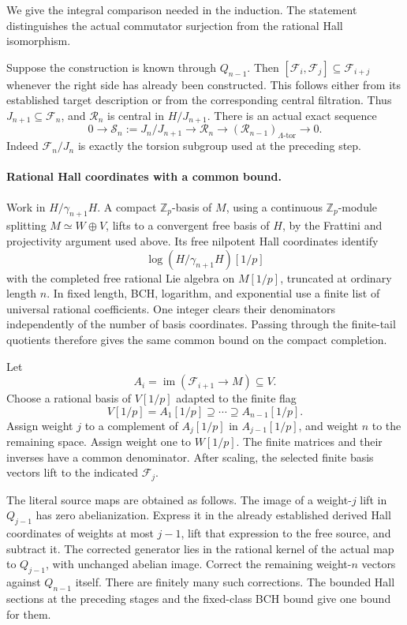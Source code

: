 \documentclass[11pt]{article}
\theoremstyle{definition}\newtheorem{definition}[theorem]{Definition}
\begin{document}
We give the integral comparison needed in the induction.
The statement distinguishes the actual commutator surjection
from the rational Hall isomorphism.

Suppose the construction is known through \(Q_{n-1}\).  Then
\([\mathcal F_i,\mathcal F_j]\subseteq \mathcal F_{i+j}\) whenever the right side has
already been constructed.  This follows either from its
established target description or from the corresponding
central filtration.  Thus \(J_{n+1}\subseteq \mathcal F_n\), and \(\mathcal R_n\)
is central in \(H/J_{n+1}\).  There is an actual exact sequence
\begin{equation}\label{eq:uniform-central-sequence}
 0\longrightarrow \mathcal S_n:=J_n/J_{n+1}
 \longrightarrow \mathcal R_n
 \longrightarrow (\mathcal R_{n-1})_{\Lambda\text{-tor}}
 \longrightarrow0.
\end{equation}
Indeed \(\mathcal F_n/J_n\) is exactly the torsion subgroup used at the
preceding step.

\paragraph{Rational Hall coordinates with a common bound.}
Work in \(H/\gamma_{n+1}H\).  A compact
\(\mathbb Z_p\)-basis of \(M\), using a continuous \(\mathbb Z_p\)-module splitting \(M\simeq W\oplus V\), lifts to a convergent
free basis of \(H\), by the Frattini and projectivity argument
used above.  Its free nilpotent Hall coordinates identify
\[
       \log(H/\gamma_{n+1}H)[1/p]
\]
with the completed free rational Lie algebra on \(M[1/p]\),
truncated at ordinary length \(n\).
In fixed length, BCH, logarithm, and exponential use a finite
list of universal rational coefficients.  One integer clears
their denominators independently of the number of basis
coordinates.  Passing through the finite-tail quotients
therefore gives the same common bound on the compact completion.

Let
\[
 A_i=\operatorname{im}(\mathcal F_{i+1}\longrightarrow M)\subseteq V.
\]
Choose a rational basis of \(V[1/p]\) adapted to the finite flag
\[
 V[1/p]=A_1[1/p]\supseteq\cdots\supseteq A_{n-1}[1/p].
\]
Assign weight \(j\) to a complement of \(A_j[1/p]\) in
\(A_{j-1}[1/p]\), and weight \(n\) to the remaining space.
Assign weight one to \(W[1/p]\).
The finite matrices and their inverses have a common denominator.
After scaling, the selected finite basis vectors lift to the
indicated \(\mathcal F_j\).

The literal source maps are obtained as follows.  The image of
a weight-\(j\) lift in \(Q_{j-1}\) has zero abelianization.
Express it in the already established derived Hall coordinates
of weights at most \(j-1\), lift that expression to the free
source, and subtract it.  The corrected generator lies in the
rational kernel of the actual map to \(Q_{j-1}\), with unchanged
abelian image.  Correct the remaining weight-\(n\) vectors
against \(Q_{n-1}\) itself.  There are finitely many such
corrections.  The bounded Hall sections at the preceding
stages and the fixed-class BCH bound give one bound for them.
\end{document}
